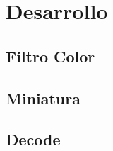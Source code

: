 \documentclass[a4paper,10pt,twoside]{article}
\begin{document}
\section{Desarrollo}

\subsection{Filtro Color}



\subsection{Miniatura}



\subsection{Decode}





%
%

%
%
\end{document}
